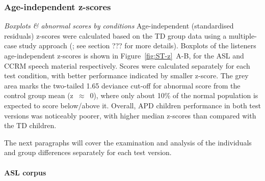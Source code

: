 \documentclass[a4paper, twoside]{templates/ociamthesis}
\begin{document}
\hypertarget{age-independent-z-scores}{%
\subsubsection*{Age-independent z-scores}\label{age-independent-z-scores}}

\colorbox[HTML]{CCCCFF}{\emph{Boxplots \& abnormal scores by conditions}}
Age-independent (standardised residuals) z-scores were calculated based on the TD group data using a multiple-case study approach (\textcite{Ramus2003}; see section ??? for more details). Boxplots of the listeners age-independent z-scores is shown in Figure~\ref{fig:ST-z}~A-B, for the ASL and CCRM speech material respectively. Scores were calculated separately for each test condition, with better performance indicated by smaller z-score. The grey area marks the two-tailed 1.65 deviance cut-off for abnormal score from the control group mean (z~\(\approx\)~0), where only about 10\% of the normal population is expected to score below/above it. Overall, APD children performance in both test versions was noticeably poorer, with higher median z-scores than compared with the TD children.

The next paragraphs will cover the examination and analysis of the individuals and group differences separately for each test version.

\hypertarget{asl-corpus}{%
\paragraph*{ASL corpus}\label{asl-corpus}}
\end{document}
